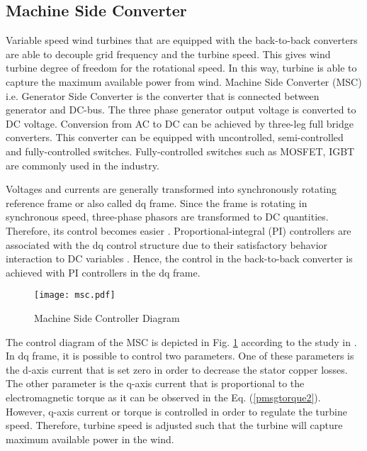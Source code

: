 \subsection{Machine Side Converter}
Variable speed wind turbines that are equipped with the back-to-back converters are able to decouple grid frequency and the turbine speed. This gives wind turbine degree of freedom for the rotational speed. In this way, turbine is able to capture the maximum available power from wind. Machine Side Converter (MSC) i.e. Generator Side Converter is the converter that is connected between generator and DC-bus. The three phase generator output voltage is converted to DC voltage. Conversion from AC to DC can be achieved by three-leg full bridge converters. This converter can be equipped with uncontrolled, semi-controlled and fully-controlled switches. Fully-controlled switches such as MOSFET, IGBT are commonly used in the industry.\par
Voltages and currents are generally transformed into synchronously rotating reference frame or also called dq frame. Since the frame is rotating in synchronous speed, three-phase phasors are transformed to DC quantities. Therefore, its control becomes easier \cite{Kazmierkowski2002}. Proportional-integral (PI) controllers are associated with the dq control structure due to their satisfactory behavior interaction to DC variables \cite{Blaabjerg2006a}. Hence, the control in the back-to-back converter is achieved with PI controllers in the dq frame. \par
\begin{figure}[h!]
	\centering
	\texttt{[image: msc.pdf]}
	\caption{Machine Side Controller Diagram}
	\label{msc}
\end{figure}
The control diagram of the MSC is depicted in Fig. \ref{msc} according to the study in \cite{Chinchilla2006}. In dq frame, it is possible to control two parameters. One of these parameters is the d-axis current that is set zero in order to decrease the stator copper losses. The other parameter is the q-axis current that is proportional to the electromagnetic torque as it can be observed in the Eq. (\ref{pmsgtorque2}). However, q-axis current or torque is controlled in order to regulate the turbine speed. Therefore, turbine speed is adjusted such that the turbine will capture maximum available power in the wind. 
